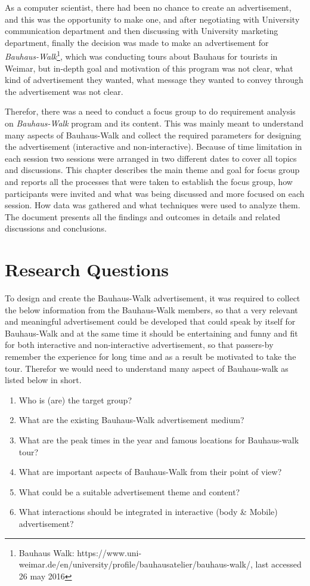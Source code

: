 As a computer scientist, there had been no chance to create an advertisement, and this was the opportunity to make one, and after negotiating with University communication department and then discussing with University marketing department, finally the decision was made to make an advertisement for \emph{Bauhaus-Walk}\footnote{Bauhaus Walk: https://www.uni-weimar.de/en/university/profile/bauhausatelier/bauhaus-walk/, last accessed 26 may 2016}, which was conducting tours about Bauhaus for tourists in Weimar, but in-depth goal and motivation of this program was not clear, what kind of advertisement they wanted, what message they wanted to convey through the advertisement was not clear.    

Therefor, there was a need to conduct a focus group to do requirement analysis on \emph{Bauhaus-Walk} program and its content. This was mainly meant to understand many aspects of Bauhaus-Walk and collect the required parameters for designing the advertisement (interactive and non-interactive). Because of time limitation in each session two sessions were arranged in two different dates to cover all topics and discussions. This chapter describes the main theme and goal for focus group and reports all the processes that were taken to establish the focus group, how participants were invited and what was being discussed and more focused on each session. How data was gathered and what techniques were used to analyze them. The document presents all the findings and outcomes in details and related discussions and conclusions.



\section{Research Questions}
To design and create the Bauhaus-Walk advertisement, it was required to collect the below information from the Bauhaus-Walk members, so that a very relevant and meaningful advertisement could be developed that could speak by itself for Bauhaus-Walk and at the same time it should be entertaining and funny and fit for both interactive and non-interactive advertisement, so that passers-by remember the experience for long time and as a result be motivated to take the tour. Therefor we would need to understand many aspect of Bauhaus-walk as listed below in short.

\begin{enumerate}
\item Who is (are) the target group?
\item What are the existing Bauhaus-Walk advertisement medium?
\item What are the peak times in the year and famous locations for Bauhaus-walk tour?
\item What are important aspects of Bauhaus-Walk from their point of view?
\item What could be a suitable advertisement theme and content?
\item What interactions should be integrated in interactive (body \& Mobile) advertisement?
\end{enumerate}


